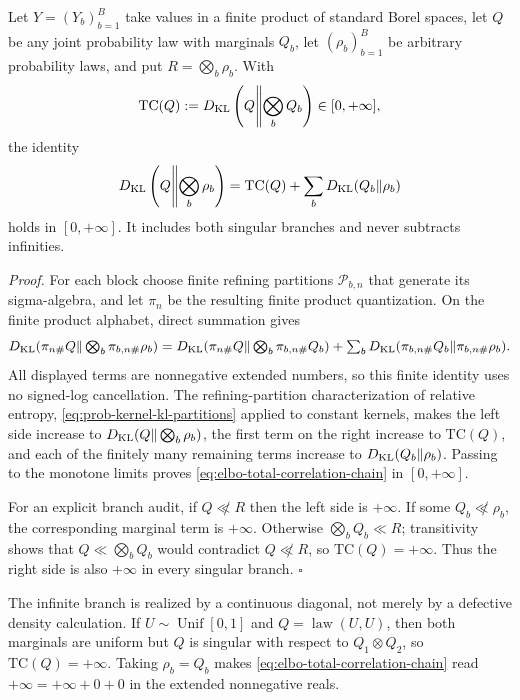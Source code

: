 Let $Y=(Y_b)_{b=1}^{B}$ take values in a finite product of standard Borel spaces, let $Q$ be any joint probability law with marginals $Q_b$, let $(\rho_b)_{b=1}^{B}$ be arbitrary probability laws, and put $R=\bigotimes_b\rho_b$. With
\[
\mathrm{TC}(Q):=D_{\mathrm{KL}}\left(Q\middle\Vert\bigotimes_bQ_b\right)\in[0,+\infty],
\]
the identity
\begin{equation}
D_{\mathrm{KL}}\left(Q\middle\Vert\bigotimes_b\rho_b\right)
=\mathrm{TC}(Q)+\sum_bD_{\mathrm{KL}}(Q_b\Vert\rho_b)
\label{eq:elbo-total-correlation-chain}
\end{equation}
holds in $[0,+\infty]$. It includes both singular branches and never subtracts infinities. 
\medskip

\emph{Proof.} For each block choose finite refining partitions $\mathcal P_{b,n}$ that generate its sigma-algebra, and let $\pi_n$ be the resulting finite product quantization. On the finite product alphabet, direct summation gives
\[
D_{\mathrm{KL}}(\pi_{n\#}Q\Vert\textstyle\bigotimes_b\pi_{b,n\#}\rho_b)
=D_{\mathrm{KL}}(\pi_{n\#}Q\Vert\textstyle\bigotimes_b\pi_{b,n\#}Q_b)
 +\sum_bD_{\mathrm{KL}}(\pi_{b,n\#}Q_b\Vert\pi_{b,n\#}\rho_b).
\]
All displayed terms are nonnegative extended numbers, so this finite identity uses no signed-log cancellation. The refining-partition characterization of relative entropy, \eqref{eq:prob-kernel-kl-partitions} applied to constant kernels, makes the left side increase to $D_{\mathrm{KL}}(Q\Vert\bigotimes_b\rho_b)$, the first term on the right increase to $\mathrm{TC}(Q)$, and each of the finitely many remaining terms increase to $D_{\mathrm{KL}}(Q_b\Vert\rho_b)$. Passing to the monotone limits proves \eqref{eq:elbo-total-correlation-chain} in $[0,+\infty]$.

For an explicit branch audit, if $Q\not\ll R$ then the left side is $+\infty$. If some $Q_b\not\ll\rho_b$, the corresponding marginal term is $+\infty$. Otherwise $\bigotimes_bQ_b\ll R$; transitivity shows that $Q\ll\bigotimes_bQ_b$ would contradict $Q\not\ll R$, so $\mathrm{TC}(Q)=+\infty$. Thus the right side is also $+\infty$ in every singular branch. \hfill$\square$

The infinite branch is realized by a continuous diagonal, not merely by a defective density calculation. If $U\sim\operatorname{Unif}[0,1]$ and $Q=\operatorname{law}(U,U)$, then both marginals are uniform but $Q$ is singular with respect to $Q_1\otimes Q_2$, so $\mathrm{TC}(Q)=+\infty$. Taking $\rho_b=Q_b$ makes \eqref{eq:elbo-total-correlation-chain} read $+\infty=+\infty+0+0$ in the extended nonnegative reals.

